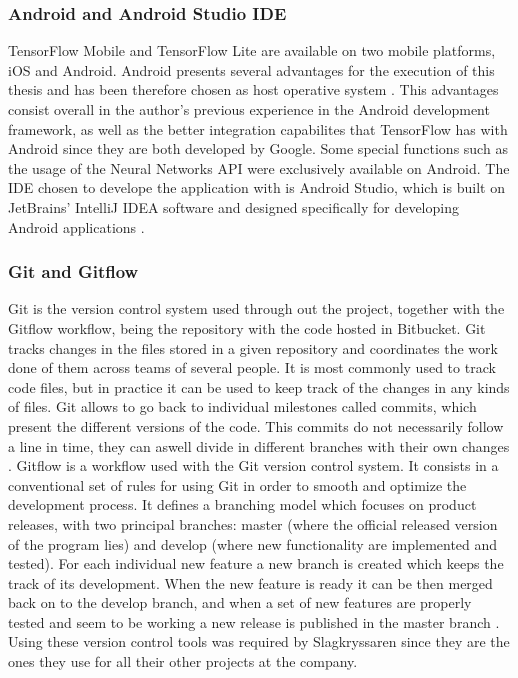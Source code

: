 \subsubsection{Android and Android Studio IDE}
TensorFlow Mobile and TensorFlow Lite are available on two mobile platforms, iOS and Android. Android presents several advantages for the execution of this thesis and has been therefore chosen as host operative system \cite{developers2011android}. This advantages consist overall in the author's previous experience in the Android development framework, as well as the better integration capabilites that TensorFlow has with Android since they are both developed by Google. Some special functions such as the usage of the Neural Networks API were exclusively available on Android. The IDE chosen to develope the application with is Android Studio, which is built on JetBrains' IntelliJ IDEA software and designed specifically for developing Android applications \cite{studio2016official}.

\subsubsection{Git and Gitflow}
Git is the version control system used through out the project, together with the Gitflow workflow, being the repository with the code hosted in Bitbucket. 
Git tracks changes in the files stored in a given repository and coordinates the work done of them across teams of several people. It is most commonly used to track code files, but in practice it can be used to keep track of the changes in any kinds of files. Git allows to go back to individual milestones called commits, which present the different versions of the code. This commits do not necessarily follow a line in time, they can aswell divide in different branches with their own changes \cite{torvalds2010git}.
Gitflow is a workflow used with the Git version control system. It consists in a conventional set of rules for using Git in order to smooth and optimize the development process. It defines a branching model which focuses on product releases, with two principal branches: master (where the official released version of the program lies) and develop (where new functionality are implemented and tested). For each individual new feature a new branch is created which keeps the track of its development. When the new feature is ready it can be then merged back on to the develop branch, and when a set of new features are properly tested and seem to be working a new release is published in the master branch \cite{dwaraki2015gitflow}.
Using these version control tools was required by Slagkryssaren since they are the ones they use for all their other projects at the company.   

